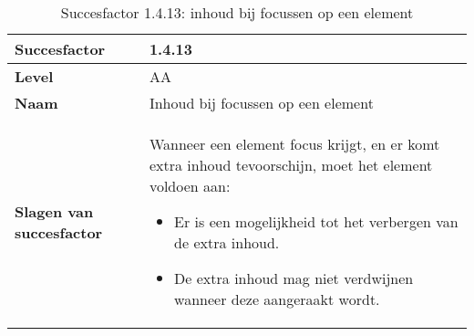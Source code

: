 \begin{table}[H]
    \centering
    \caption{Succesfactor 1.4.13: inhoud bij focussen op een element}
    
    
    \hspace*{-1cm}\begin{tabular}{|l|p{12cm}|} 
        \hline
        \textbf{Succesfactor}                 & 1.4.13                                                                                                                                                                                                                                                                                                                                                                                                                                                                                                         \\ 
        \hline
        \textbf{Level}                        & AA                                                                                                                                                                                                                                                                                                                                                                                                                                                                                                                 \\ 
        \hline
        \textbf{Naam}                         & Inhoud bij focussen op een element~                                                                                                                                                                                                                                                                                                                                                                                                                                                                                      \\ 
        \hline
        \textbf{Slagen van succesfactor}      & Wanneer een element focus krijgt, en er komt extra inhoud tevoorschijn, moet het element voldoen aan: \begin{itemize}
            \item Er is een mogelijkheid tot het verbergen van de extra inhoud.
            \item De extra inhoud mag niet verdwijnen wanneer deze aangeraakt wordt.

\end{itemize}
\end{tabular}
\end{table}
